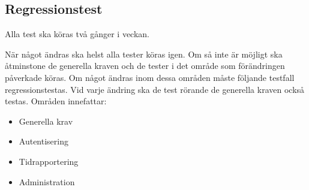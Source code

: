 \documentclass[a4paper]{article}
\begin{document}
\subsection{Regressionstest}

Alla test ska köras två gånger i veckan.

När något ändras ska helst alla tester köras igen. Om så inte är möjligt ska åtminstone de
generella kraven och de tester i det område som förändringen påverkade köras.
Om något ändras inom dessa områden måste följande testfall regressionstestas. Vid varje
ändring ska de test rörande de generella kraven också testas.
Områden innefattar:

\begin{itemize}

\item
Generella krav

\item
Autentisering

\item
Tidrapportering

\item
Administration

\end{itemize}
\end{document}
